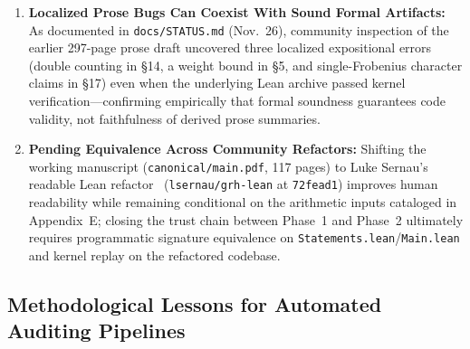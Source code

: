 \documentclass[11pt,a4paper]{article}
\begin{document}
\begin{enumerate}
  \item \textbf{Localized Prose Bugs Can Coexist With Sound Formal Artifacts:} As documented in \texttt{docs/STATUS.md} (Nov.\ 26), community inspection of the earlier 297-page prose draft uncovered three localized expositional errors (double counting in \S14, a weight bound in \S5, and single-Frobenius character claims in \S17) even when the underlying Lean archive passed kernel verification---confirming empirically that formal soundness guarantees code validity, not faithfulness of derived prose summaries.
  \item \textbf{Pending Equivalence Across Community Refactors:} Shifting the working manuscript (\texttt{canonical/main.pdf}, 117 pages) to Luke Sernau's readable Lean refactor~\cite{sernau2026} (\texttt{lsernau/grh-lean} at \texttt{72fead1}) improves human readability while remaining conditional on the arithmetic inputs cataloged in Appendix~E; closing the trust chain between Phase~1 and Phase~2 ultimately requires programmatic signature equivalence on \texttt{Statements.lean}/\texttt{Main.lean} and kernel replay on the refactored codebase.
\end{enumerate}

\subsection{Methodological Lessons for Automated Auditing Pipelines}
\end{document}
